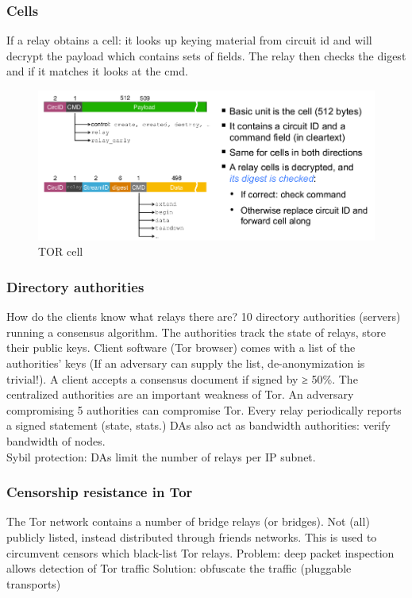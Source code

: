 \documentclass[11pt,oneside,a4paper]{article}
\begin{document}
\subsubsection{Cells}

If a relay obtains a cell: it looks up keying material from circuit id and will decrypt the payload which contains sets of fields. The relay then checks the digest and if it matches it looks at the cmd.

\begin{figure}[hb]
	\centering
	\includegraphics[width=0.7\linewidth]{figures/tor_cell}
	\caption{TOR cell}
	\label{fig:torcell}
\end{figure}

\subsubsection{Directory authorities}

How do the clients know what relays there are? 10 directory authorities (servers) running a consensus algorithm. The authorities track the state of relays, store their public keys. Client software (Tor browser) comes with a list of the authorities’ keys (If an adversary can supply the list, de-anonymization is trivial!). A client accepts a consensus document if signed by ≥ 50\%. The centralized authorities are an important weakness of Tor. An adversary compromising 5 authorities can compromise Tor. Every relay periodically reports a signed statement (state, stats.) DAs also act as bandwidth authorities: verify bandwidth of nodes.\\
Sybil protection: DAs limit the number of relays per IP subnet.

\subsubsection{Censorship resistance in Tor}

The Tor network contains a number of bridge relays (or bridges). Not (all) publicly listed, instead distributed through friends networks. This is used to circumvent censors which black-list Tor relays. Problem: deep packet inspection allows detection of Tor traffic
Solution: obfuscate the traffic (pluggable transports)
\end{document}
